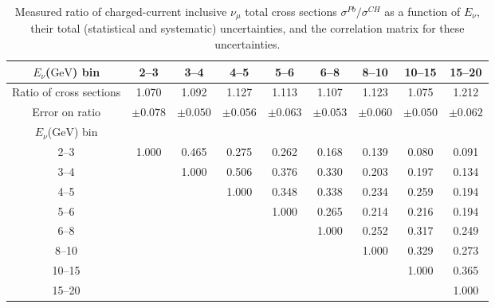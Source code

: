 \documentclass[aps,preprint,showpacs,superscriptaddress]{revtex4} %
\newcommand{\numu}{\ensuremath{\nu_{\mu}}\xspace}
\newcommand{\GeV}{\ensuremath{\mbox{GeV}}\xspace}
\newcommand{\Enu}{\ensuremath{E_{\nu}}\xspace}
\begin{document}
\begingroup
\squeezetable
\begin{table}
  \begin{tabular}{c|cccccccc}
    \hline \hline
    \Enu (\GeV) bin & 2--3 & 3--4 & 4--5 & 5--6 & 6--8 & 8--10 & 10--15 & 15--20 \\ 
    \hline
    Ratio of cross sections & 1.070 & 1.092 & 1.127 & 1.113 & 1.107 & 1.123 & 1.075 & 1.212 \\ 
    Error on ratio & $ \pm 0.078 $ & $ \pm 0.050 $ & $ \pm 0.056 $ & $ \pm 0.063 $ & $ \pm 0.053 $ & $ \pm 0.060 $ & $ \pm 0.050 $ & $ \pm 0.062 $ \\ 
    \hline
    \Enu (\GeV) bin &  &  &  &  &  &  &  &  \\ 
    2--3 & 1.000 & 0.465 & 0.275 & 0.262 & 0.168 & 0.139 & 0.080 & 0.091 \\ 
    3--4 &  & 1.000 & 0.506 & 0.376 & 0.330 & 0.203 & 0.197 & 0.134 \\ 
    4--5 &  &  & 1.000 & 0.348 & 0.338 & 0.234 & 0.259 & 0.194 \\ 
    5--6 &  &  &  & 1.000 & 0.265 & 0.214 & 0.216 & 0.194 \\ 
    6--8 &  &  &  &  & 1.000 & 0.252 & 0.317 & 0.249 \\ 
    8--10 &  &  &  &  &  & 1.000 & 0.329 & 0.273 \\ 
    10--15 &  &  &  &  &  &  & 1.000 & 0.365 \\ 
    15--20 &  &  &  &  &  &  &  & 1.000 \\ 
    \hline \hline
  \end{tabular}
  \caption{Measured ratio of charged-current inclusive \numu total cross sections $\sigma^{Pb}/\sigma^{CH}$ as a function of \Enu, their total (statistical and systematic) uncertainties, and the correlation matrix for these uncertainties.}
  \label{tab:Enu_ratio_82_93_results_table}
\end{table}
\endgroup


\clearpage
\end{document}
